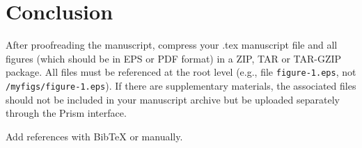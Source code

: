 \documentclass{osa-article}
\begin{document}
\section{Conclusion}
After proofreading the manuscript, compress your .tex manuscript file and all figures (which should be in EPS or PDF format) in a ZIP, TAR or TAR-GZIP package. All files must be referenced at the root level (e.g., file \texttt{figure-1.eps}, not \texttt{/myfigs/figure-1.eps}). If there are supplementary materials, the associated files should not be included in your manuscript archive but be uploaded separately through the Prism interface.


Add references with BibTeX or manually.
\cite{Zhang:14,OSA,FORSTER2007,Dean2006,testthesis,Yelin:03,Masajada:13,codeexample}







\end{document}
